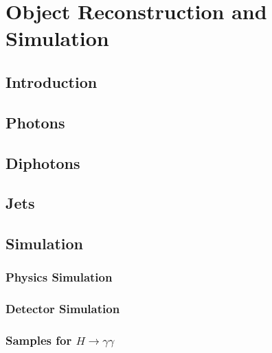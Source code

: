 \chapter{Object Reconstruction and Simulation}
\label{chap:object_reco}


\newpage

\section{Introduction}


\section{Photons}


\section{Diphotons}


\section{Jets}


\section{Simulation}
\subsection{Physics Simulation}
\subsection{Detector Simulation}
\subsection{Samples for $H\rightarrow\gamma\gamma$}
